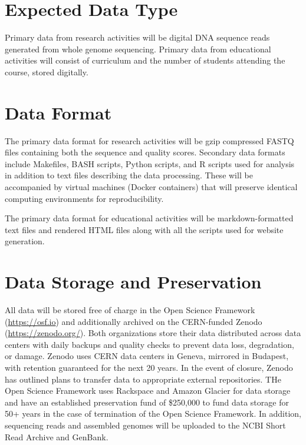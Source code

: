 \documentclass[12pt,letterpaper]{article}
\title{\ruleline{Data Management Plan}}
\begin{document}
\maketitle

\section{Expected Data Type}

Primary data from research activities will be digital DNA sequence reads generated from whole genome sequencing. Primary data from educational activities will consist of curriculum and the number of students attending the course, stored digitally. 

\section{Data Format}

The primary data format for research activities will be gzip compressed FASTQ files containing both the sequence and quality scores. Secondary data formats include Makefiles, BASH scripts, Python scripts, and R scripts used for analysis in addition to text files describing the data processing.
These will be accompanied by virtual machines (Docker containers) that will preserve identical computing environments for reproducibility. 

The primary data format for educational activities will be markdown-formatted text files and rendered HTML files along with all the scripts used for website generation. 

\section{Data Storage and Preservation}


All data will be stored free of charge in the Open Science Framework (\url{https://osf.io}) and additionally archived on the CERN-funded Zenodo (\url{https://zenodo.org/}). 
Both organizations store their data distributed across data centers with daily backups and quality checks to prevent data loss, degradation, or damage.
Zenodo uses CERN data centers in Geneva, mirrored in Budapest, with retention guaranteed for the next 20 years. 
In the event of closure, Zenodo has outlined plans to transfer data to appropriate external repositories.
THe Open Science Framework uses Rackspace and Amazon Glacier for data storage and have an established preservation fund of \$250,000 to fund data storage for 50+ years in the case of termination of the Open Science Framework. 
In addition, sequencing reads and assembled genomes will be uploaded to the NCBI Short Read Archive and GenBank. 
\end{document}
